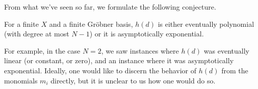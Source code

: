 From what we've seen so far, we formulate the following conjecture.
\begin{conj}
	For a finite $X$ and a finite Gr\"obner basis, $h(d)$ is either eventually polynomial (with degree at most $N-1$) or it is asymptotically exponential.
\end{conj}
For example, in the case $N = 2$, we saw instances where $h(d)$ was eventually linear (or constant, or zero), and an instance where it was asymptotically exponential.
Ideally, one would like to discern the behavior of $h(d)$ from the monomials $m_i$ directly, but it is unclear to us how one would do so.

